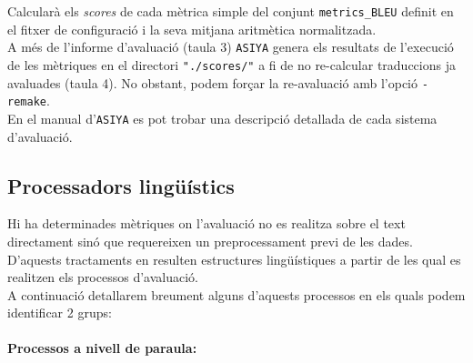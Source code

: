 \documentclass[11pt,a4paper]{article}
\begin{document}
Calcularà els \textit{scores} de cada mètrica simple del conjunt \texttt{metrics\_BLEU} definit en el fitxer de configuració i la seva mitjana aritmètica normalitzada.
\\

A més de l'informe d'avaluació (taula 3) \texttt{ASIYA} genera els resultats de l'execució de les mètriques en el directori \texttt{"./scores/"} a fi de no re-calcular traduccions ja avaluades (taula 4). No obstant, podem forçar la re-avaluació amb l'opció \texttt{-remake}.
\\

En el manual d'\texttt{ASIYA} es pot trobar una descripció detallada de cada sistema d'avaluació\cite{asiya_manual}.



\subsection{Processadors lingüístics}

Hi ha determinades mètriques on l'avaluació no es realitza sobre el text directament sinó que requereixen un preprocessament previ de les dades. D'aquests tractaments en resulten estructures lingüístiques a partir de les qual es realitzen els processos d'avaluació.
\\

A continuació detallarem breument alguns d'aquests processos en els quals podem identificar 2 grups:

\paragraph{\textbf{Processos a nivell de paraula}:}
\end{document}
